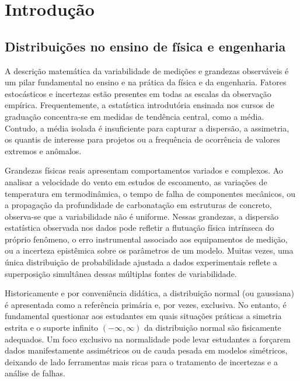 \section{Introdução}\label{sec:introducao}

\subsection{Distribuições no ensino de física e engenharia}

A descrição matemática da variabilidade de medições e grandezas observáveis é um pilar fundamental no ensino e na prática da física e da engenharia. Fatores estocásticos e incertezas estão presentes em todas as escalas da observação empírica. Frequentemente, a estatística introdutória ensinada nos cursos de graduação concentra-se em medidas de tendência central, como a média. Contudo, a média isolada é insuficiente para capturar a dispersão, a assimetria, os quantis de interesse para projetos ou a frequência de ocorrência de valores extremos e anômalos.

Grandezas físicas reais apresentam comportamentos variados e complexos. Ao analisar a velocidade do vento em estudos de escoamento, as variações de temperatura em termodinâmica, o tempo de falha de componentes mecânicos, ou a propagação da profundidade de carbonatação em estruturas de concreto, observa-se que a variabilidade não é uniforme. Nessas grandezas, a dispersão estatística observada nos dados pode refletir a flutuação física intrínseca do próprio fenômeno, o erro instrumental associado aos equipamentos de medição, ou a incerteza epistêmica sobre os parâmetros de um modelo. Muitas vezes, uma única distribuição de probabilidade ajustada a dados experimentais reflete a superposição simultânea dessas múltiplas fontes de variabilidade.

Historicamente e por conveniência didática, a distribuição normal (ou gaussiana) é apresentada como a referência primária e, por vezes, exclusiva. No entanto, é fundamental questionar aos estudantes em quais situações práticas a simetria estrita e o suporte infinito $(-\infty, \infty)$ da distribuição normal são fisicamente adequados. Um foco exclusivo na normalidade pode levar estudantes a forçarem dados manifestamente assimétricos ou de cauda pesada em modelos simétricos, deixando de lado ferramentas mais ricas para o tratamento de incertezas e a análise de falhas.

